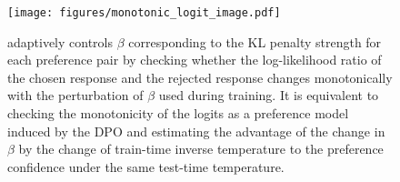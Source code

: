\begin{figure}[!t]
  \texttt{[image: figures/monotonic\_logit\_image.pdf]}
  \caption{\method{} adaptively controls $\beta$ corresponding to the KL penalty strength for each preference pair by checking whether the log-likelihood ratio of the chosen response and the rejected response changes monotonically with the perturbation of $\beta$ used during training. It is equivalent to checking the monotonicity of the logits as a preference model induced by the DPO and estimating the advantage of the change in $\beta$ by the change of train-time inverse temperature to the preference confidence under the same test-time temperature.}
  \label{fig:monotonic_logit}
\end{figure}